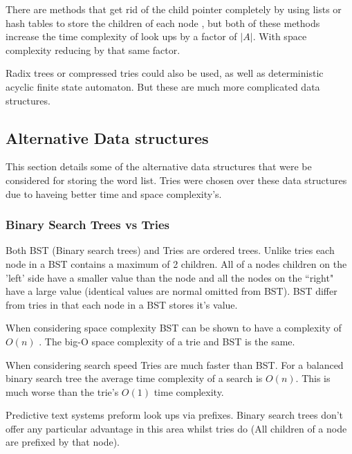 \documentclass[10pt]{article} %
\begin{document}
                There are methods that get rid of the child pointer completely by using lists or hash tables to store the children of each node , but both of these methods increase the time complexity of look ups by a factor of \begin{math}\vert A \vert \end{math}. With space complexity reducing by that same factor.
                
                Radix trees or compressed tries could also be used, as well as deterministic acyclic finite state automaton. But these are much more complicated data structures.
                
		\subsection{Alternative Data structures}
		    This section details some of the alternative data structures that were be considered for storing the word list. Tries were chosen over these data structures due to haveing better time and space complexity's.
		    
			\subsubsection{Binary Search Trees vs Tries}
			    Both BST (Binary search trees) and Tries are ordered trees.
			    Unlike tries each node in a BST contains a maximum of 2 children. All of a nodes children on the 'left' side have a smaller value than the node and all the nodes on the ``right" have a large value (identical values are normal omitted from BST). BST differ from tries in that each node in a BST stores it's value.
			    
			    When considering space complexity BST can be shown to have a complexity of \begin{math}O(n)\end{math} \cite{book:BST:complexity}. 
			    The big-O space complexity of a trie and BST is the same.
			    
			    When considering search speed Tries are much faster than BST. For a balanced binary search tree the average time complexity of a search is \begin{math} O(n) \end{math}. This is much worse than the trie's \begin{math} O(1) \end{math} time complexity.
			    
			    Predictive text systems preform look ups via prefixes. Binary search trees don't offer any particular advantage in this area whilst tries do (All children of a node are prefixed by that node).
			    
\end{document}
